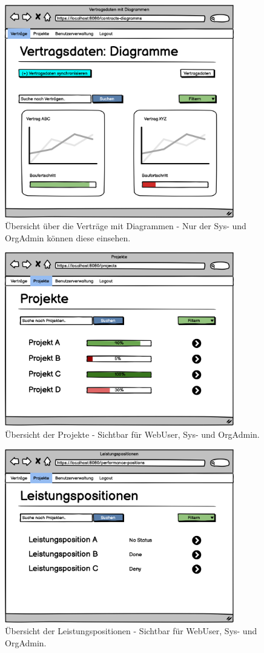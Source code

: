 \begin{figure}[h]
\centering
\includegraphics[width=10cm]{img/mockup_web/admin-vertraege-diagramme.png}
\caption{Übersicht über die Verträge mit Diagrammen - Nur der Sys- und OrgAdmin können diese einsehen.}
\end{figure}

\begin{figure}[h]
\centering
\includegraphics[width=10cm]{img/mockup_web/admin-und-benutzer-projekte.png}
\caption{Übersicht der Projekte - Sichtbar für WebUser, Sys- und OrgAdmin.}
\end{figure}

\begin{figure}[h]
\centering
\includegraphics[width=10cm]{img/mockup_web/admin-und-benutzer-leistungspositionen.png}
\caption{Übersicht der Leistungspositionen - Sichtbar für WebUser, Sys- und OrgAdmin.}
\end{figure}

